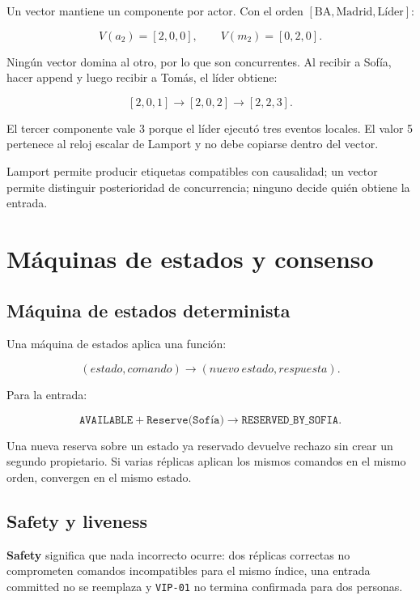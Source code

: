 \documentclass[variant=apuntes,cover=institutional,mode=screen]{ua-engineering-v6-article}
\begin{document}
Un vector mantiene un componente por actor. Con el orden \([\text{BA},\text{Madrid},\text{Líder}]\):

\[
V(a_2)=[2,0,0],\qquad V(m_2)=[0,2,0].
\]

Ningún vector domina al otro, por lo que son concurrentes. Al recibir a Sofía, hacer append y luego recibir a Tomás, el líder obtiene:

\[
[2,0,1]\rightarrow[2,0,2]\rightarrow[2,2,3].
\]

El tercer componente vale 3 porque el líder ejecutó tres eventos locales. El valor 5 pertenece al reloj escalar de Lamport y no debe copiarse dentro del vector.

\begin{uakeybox}
Lamport permite producir etiquetas compatibles con causalidad; un vector permite distinguir posterioridad de concurrencia; ninguno decide quién obtiene la entrada.
\end{uakeybox}

\section{Máquinas de estados y consenso}

\subsection{Máquina de estados determinista}

Una máquina de estados aplica una función:

\[
(estado,comando)\longrightarrow(nuevo\ estado,respuesta).
\]

Para la entrada:

\[
\texttt{AVAILABLE}+\texttt{Reserve(Sofía)}\rightarrow\texttt{RESERVED\_BY\_SOFIA}.
\]

Una nueva reserva sobre un estado ya reservado devuelve rechazo sin crear un segundo propietario. Si varias réplicas aplican los mismos comandos en el mismo orden, convergen en el mismo estado.

\subsection{Safety y liveness}

\textbf{Safety} significa que nada incorrecto ocurre: dos réplicas correctas no comprometen comandos incompatibles para el mismo índice, una entrada committed no se reemplaza y \texttt{VIP-01} no termina confirmada para dos personas.
\end{document}
